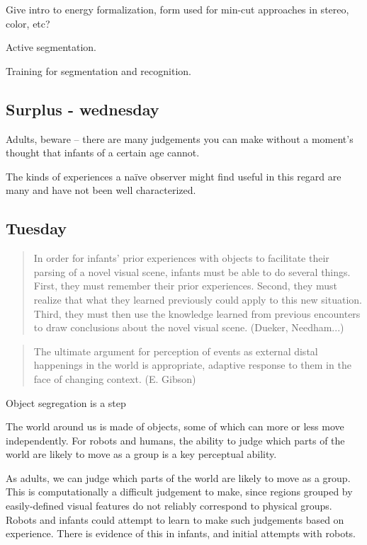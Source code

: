 Give intro to energy formalization, form used
for min-cut approaches in stereo, color, etc?

Active segmentation.

Training for segmentation and recognition.


\subsection{Surplus - wednesday}


Adults, beware -- there are many judgements you can make without a
moment's thought that infants of a certain age cannot.

The kinds of experiences a na\"{i}ve observer might find
useful in this regard are many and have not been well characterized.



\subsection{Tuesday}

\begin{quote}

In order for infants' prior experiences with objects
to facilitate their parsing of a novel visual scene,
infants must be able to do several things.  First, they
must remember their prior experiences.  Second, they 
must realize that what they learned previously could
apply to this new situation.  Third, they must then
use the knowledge learned from previous encounters
to draw conclusions about the novel visual scene.
(Dueker, Needham...)

\end{quote}


\begin{quote}

The ultimate argument for perception of events as external distal
happenings in the world is appropriate, adaptive response to them
in the face of changing context. (E. Gibson)

\end{quote}


Object segregation is a step


The world around us is made of objects, some of which can more or less
move independently. For robots and humans, the ability to judge which
parts of the world are likely to move as a group is a key perceptual
ability.


As adults, we can judge which parts of the world
are likely to move as a group. This is computationally a difficult
judgement to make, since regions grouped by easily-defined visual
features do not reliably correspond to physical groups. Robots and
infants could attempt to learn to make such judgements based on
experience. There is evidence of this in infants, and initial attempts
with robots.



